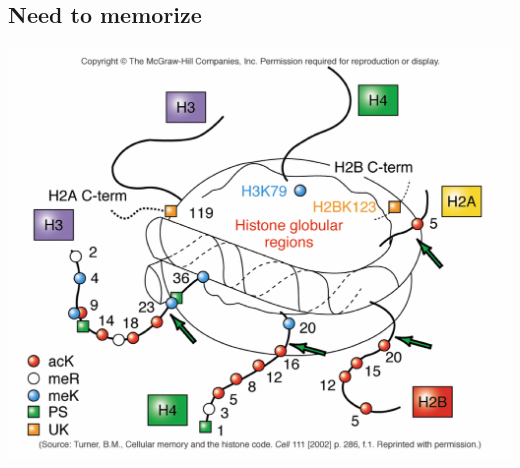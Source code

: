 \documentclass[10pt]{article}
\begin{document}
\subsection*{Need to memorize}
\begin{center}
  \includegraphics{histonecode.png}
\end{center}
\end{document}
